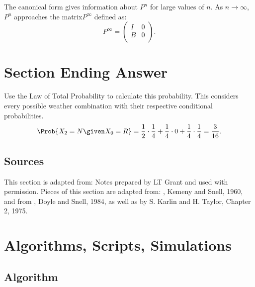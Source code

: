 \documentclass[12pt]{article}
\begin{document}
The canonical form gives information about \( P^n \) for large values of
\( n \). As \( n\to\infty \), \( P^n \) approaches the matrix\( P^\infty
\) defined as:
\[
    P^\infty =
    \begin{pmatrix}
        I & 0 \\
        B & 0 \\
    \end{pmatrix}
    .
\]

\hr

\section*{Section Ending Answer}

Use the Law of Total Probability to calculate this probability.  This
considers every possible weather combination with their respective
conditional probabilities.
\[
    \Prob{X_2 = N \given X_0 = R} = \frac{1}{2} \cdot \frac{1}{4} +
    \frac{1}{4} \cdot 0 + \frac{1}{4} \cdot \frac{1}{4} = \frac{3}{16}.
\]

\subsection*{Sources}

This section is adapted from:  Notes prepared by LT Grant and used with
permission.  Pieces of this section are adapted from:  , Kemeny and Snell, 1960, and from , Doyle and Snell, 1984, as well as  by S. Karlin and H. Taylor,
Chapter 2, 1975.

\hr

\section*{Algorithms, Scripts, Simulations}

\subsection*{Algorithm}
\end{document}

